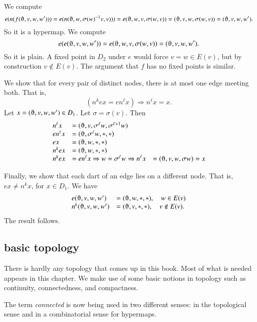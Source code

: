 \begin{lemma}  We compute
    $$e(n(f(\orgn,v,w,w'))) = e(n(\orgn,w,\sigma(w)^{-1} v,v))) =
        e(\orgn,w,v,\sigma(w, v)) = (\orgn,v,w,\sigma(w, v)) = (\orgn,v,w,w').$$
So it is a hypermap. We compute
    $$e(e(\orgn,v,w,w')) = e(\orgn,w,v,\sigma(w,v)) = (\orgn,v,w,w').$$
So it is plain. A fixed point in $D_2$ under $e$ would force $v = w\in E(v)$,
but by construction $v\not\in E(v)$.  The argument that $f$ has no
fixed points is similar.

   We show that for every pair of distinct nodes, there is at most one edge
meeting both.
That is,
        $$(n^k e x = e n^\ell x)\Rightarrow n^\ell x = x.$$
Let $x = (\orgn,v,w,w')\in D_1$.  Let $\sigma=\sigma(v)$. Then
    $$
    \begin{array}{lll}
    n^\ell x &= (\orgn,v,\sigma^\ell w,\sigma^{\ell+1}w)\\
    e n^\ell x &= (\orgn,\sigma^\ell w,*,*)\\
    e x &= (\orgn,w,*,*)\\
    n^k e x &= (\orgn,w,*,*)\\
    n^k e x &= e n^\ell x \Rightarrow w = \sigma^\ell w \Rightarrow
    n^\ell x &= (\orgn,v,w,\sigma w) = x
    \end{array}
    $$

Finally, we show that each dart of an edge lies on a different node.
That is, $e x \ne n^k x$, for $x\in D_1$.  We have
    $$
    \begin{array}{lll}
        e(\orgn,v,w,w') &= (\orgn,w,*,*),\quad w\in E(v)\\
        n^k(\orgn,v,w,w') &= (\orgn,v,*,*),\quad v\not\in E(v).
    \end{array}
    $$
The result follows.
\end{lemma}

\subsection{basic topology}

There is hardly any topology that comes up in this book.  Most of
what is needed appears in this chapter.  We make use of some basic
notions in topology such as continuity, connectedness, and compactness.

\begin{remark} The term {\it connected} is now being used in
two different senses: in the topological sense and in a combinatorial
sense for hypermaps.
\end{remark}





